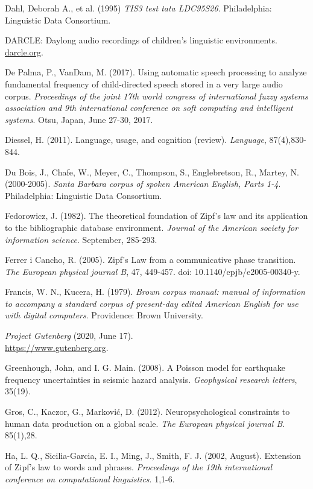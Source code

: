 \documentclass[12pt]{article}
\begin{document}
\begin{thebibliography}{50}
Dahl, Deborah A., et al. (1995) \emph{TIS3 test tata LDC95S26}. Philadelphia: Linguistic Data Consortium.

DARCLE: Daylong audio recordings of children's linguistic environments.
\url{darcle.org}.

De Palma, P., VanDam, M. (2017).  Using automatic speech processing to analyze fundamental frequency of child-directed speech stored in a very large audio corpus. \emph{Proceedings of the joint 17th world congress of international fuzzy systems association and 9th international conference on soft computing and intelligent systems}. Otsu, Japan, June 27-30, 2017.

Diessel, H. (2011). Language, usage, and cognition (review). \emph{Language}, 87(4),830-844.

Du Bois, J., Chafe, W.,  Meyer, C., Thompson, S., Englebretson, R., Martey, N. (2000-2005). \emph{Santa Barbara corpus of spoken American English, Parts 1-4}. Philadelphia: Linguistic Data Consortium.

Fedorowicz, J. (1982). The theoretical foundation of Zipf's law and its application to the bibliographic database environment. \emph{Journal of the American society for information science}. September, 285-293.

Ferrer i Cancho, R. (2005). Zipf's Law from a communicative phase transition.  \emph{The European physical journal B}, 47, 449-457. doi: 10.1140/epjb/e2005-00340-y.

Francis, W. N., Kucera, H. (1979). \emph{Brown corpus manual: manual of information to accompany a standard corpus of present-day edited American English for use with digital computers}. Providence: Brown University.

\emph{Project Gutenberg} (2020, June 17). \\
\url{https://www.gutenberg.org}.

Greenhough, John, and I. G. Main. (2008). A Poisson model for earthquake frequency uncertainties in seismic hazard analysis. \emph{Geophysical research letters}, 35(19).

Gros, C., Kaczor, G., Marković, D. (2012). Neuropsychological constraints to human data production on a global scale. \emph{The European physical journal B}. 85(1),28.

Ha, L. Q., Sicilia-Garcia, E. I., Ming, J., Smith, F. J. (2002, August). Extension of Zipf's law to words and phrases. \emph{Proceedings of the 19th international conference on computational linguistics}. 1,1-6. 


\end{thebibliography}
\end{document}

